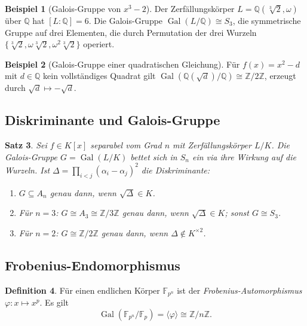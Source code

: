 \documentclass[12pt,a4paper]{amsart}
\newtheorem{theorem}{Satz}[section]
\theoremstyle{definition}
\newtheorem{definition}[theorem]{Definition}
\newtheorem{beispiel}[theorem]{Beispiel}
\newcommand{\Q}{\mathbb{Q}}
\newcommand{\Z}{\mathbb{Z}}
\newcommand{\F}{\mathbb{F}}
\newcommand{\Gal}{\operatorname{Gal}}
\begin{document}
\begin{beispiel}[Galois-Gruppe von $x^3 - 2$]
Der Zerfällungskörper $L = \Q(\sqrt[3]{2}, \omega)$ über $\Q$ hat $[L:\Q] = 6$.
Die Galois-Gruppe $\Gal(L/\Q) \cong S_3$, die symmetrische Gruppe auf drei
Elementen, die durch Permutation der drei Wurzeln
$\{\sqrt[3]{2}, \omega\sqrt[3]{2}, \omega^2\sqrt[3]{2}\}$ operiert.
\end{beispiel}

\begin{beispiel}[Galois-Gruppe einer quadratischen Gleichung]
Für $f(x) = x^2 - d$ mit $d \in \Q$ kein vollständiges Quadrat gilt
$\Gal(\Q(\sqrt{d})/\Q) \cong \Z/2\Z$,
erzeugt durch $\sqrt{d} \mapsto -\sqrt{d}$.
\end{beispiel}

\subsection{Diskriminante und Galois-Gruppe}

\begin{theorem}
Sei $f \in K[x]$ separabel vom Grad $n$ mit Zerfällungskörper $L/K$.
Die Galois-Gruppe $G = \Gal(L/K)$ bettet sich in $S_n$ ein via ihre Wirkung
auf die Wurzeln. Ist $\Delta = \prod_{i < j}(\alpha_i - \alpha_j)^2$ die
Diskriminante:
\begin{enumerate}[label=(\roman*)]
  \item $G \subseteq A_n$ genau dann, wenn $\sqrt{\Delta} \in K$.
  \item Für $n = 3$: $G \cong A_3 \cong \Z/3\Z$ genau dann, wenn
        $\sqrt{\Delta} \in K$; sonst $G \cong S_3$.
  \item Für $n = 2$: $G \cong \Z/2\Z$ genau dann, wenn
        $\Delta \notin K^{\times 2}$.
\end{enumerate}
\end{theorem}

\subsection{Frobenius-Endomorphismus}

\begin{definition}
Für einen endlichen Körper $\F_{p^n}$ ist der \emph{Frobenius-Automorphismus}
$\varphi: x \mapsto x^p$. Es gilt
\[
  \Gal(\F_{p^n}/\F_p) = \langle \varphi \rangle \cong \Z/n\Z.
\]
\end{definition}

\end{document}

